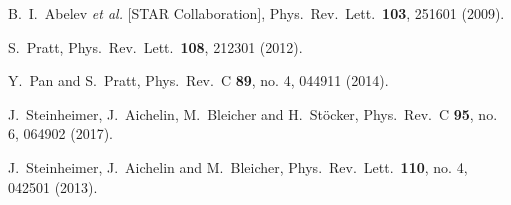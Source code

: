 \begin{thebibliography}{99}
  B.~I.~Abelev {\it et al.} [STAR Collaboration],
  Phys.\ Rev.\ Lett.\  {\bf 103}, 251601 (2009).


  S.~Pratt,
  Phys.\ Rev.\ Lett.\  {\bf 108}, 212301 (2012).


  Y.~Pan and S.~Pratt,
  Phys.\ Rev.\ C {\bf 89}, no. 4, 044911 (2014).

  J.~Steinheimer, J.~Aichelin, M.~Bleicher and H.~Stöcker,
  Phys.\ Rev.\ C {\bf 95}, no. 6, 064902 (2017).
 
  J.~Steinheimer, J.~Aichelin and M.~Bleicher,
  Phys.\ Rev.\ Lett.\  {\bf 110}, no. 4, 042501 (2013).
  

\begin{comment}

  R.~Bellwied, S.~Borsanyi, Z.~Fodor, S.~D.~Katz, A.~Pasztor, C.~Ratti and K.~K.~Szabo,
  Phys.\ Rev.\ D {\bf 92}, no. 11, 114505 (2015).



\end{comment}
\end{thebibliography}
